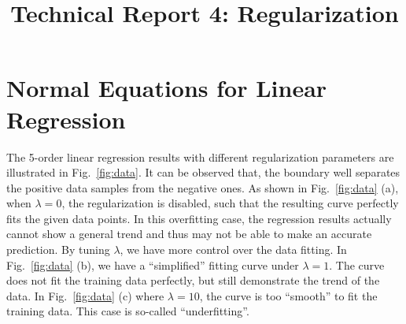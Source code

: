 \documentclass[10pt,a4paper]{article}
\date{}
\begin{document}
\title{Technical Report 4: Regularization}

\maketitle

\section{Normal Equations for Linear Regression}
%
  The 5-order linear regression results with different regularization parameters are illustrated in Fig.~\ref{fig:data}. It can be observed that, the boundary well separates the positive data samples from the negative ones. As shown in Fig.~\ref{fig:data} (a), when $\lambda=0$, the regularization is disabled, such that the resulting curve perfectly fits the given data points. In this overfitting case, the regression results actually cannot show a general trend and thus may not be able to make an accurate prediction. By tuning $\lambda$, we have more control over the data fitting. In Fig.~\ref{fig:data} (b), we have a ``simplified'' fitting curve under $\lambda=1$. The curve does not fit the training data perfectly, but still demonstrate the trend of the data. In Fig.~\ref{fig:data} (c) where $\lambda=10$, the curve is too ``smooth'' to fit the training data. This case is so-called ``underfitting''.
%
\end{document}
